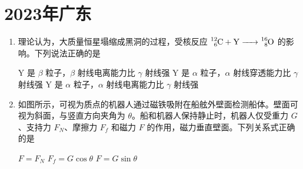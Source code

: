 \documentclass[\gkver]{gaokaozhenti}
\begin{document}
\chapter{2023年广东}

\begin{enumerate}
\item
理论认为，大质量恒星塌缩成黑洞的过程，受核反应 $\ce{^{12}_{6}C + Y -> ^{16}_{8}O}$ 的影响。下列说法正确的是

{Y 是 $\beta$ 粒子，$\beta$ 射线电离能力比 $\gamma$ 射线强}
{Y 是 $\alpha$ 粒子，$\alpha$ 射线穿透能力比 $\gamma$ 射线强}
{Y 是 $\alpha$ 粒子，$\alpha$ 射线电离能力比 $\gamma$ 射线强}


\item
如图所示，可视为质点的机器人通过磁铁吸附在船舷外壁面检测船体。壁面可视为斜面，与竖直方向夹角为 $\theta$。船和机器人保持静止时，机器人仅受重力 $G$、支持力 $F_{N}$、摩擦力 $F_{f}$ 和磁力 $F$ 的作用，磁力垂直壁面。下列关系式正确的是


{$F = F_{N}$}
{$F_{f} = G\cos\theta$}
{$F = G\sin\theta$}

\end{enumerate}
\end{document}

